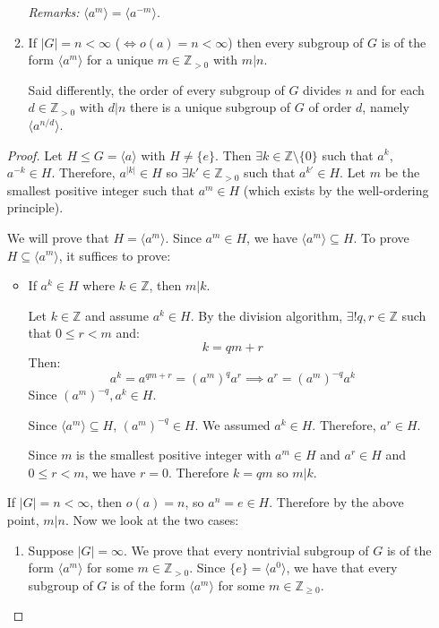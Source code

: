 \begin{itemize}
\begin{theorem}
\begin{enumerate}
            \textit{Remarks:} $\langle a^m \rangle = \langle a^{-m}\rangle $.
            \item If $|G|=n < \infty$ ($\iff o(a) = n < \infty$) then every subgroup of $G$ is of the form $\langle a^m\rangle$ for a unique $m \in \mathbb{Z}_{>0}$ with $m|n$.
            
            Said differently, the order of every subgroup of $G$ divides $n$ and for each $d\in \mathbb{Z}_{>0}$ with $d|n$ there is a unique subgroup of $G$ of order $d$, namely $\langle a^{n/d} \rangle$.
        \end{enumerate}
    \end{theorem}
    \begin{proof}
        Let $H \le G = \langle a\rangle$ with $H \neq \{e\}$. Then $\exists k \in \mathbb{Z} \setminus \{0\}$ such that $a^k$, $a^{-k} \in H$. Therefore, $a^{|k|} \in H$ so $\exists k' \in \mathbb{Z}_{>0}$ such that $a^{k'} \in H$. Let $m$ be the smallest positive integer such that $a^m \in H$ (which exists by the well-ordering principle).
        \vspace{2mm}

        We will prove that $H= \langle a^m \rangle$. Since $a^m \in H$, we have $\langle a^m\rangle \subseteq H$. To prove $H \subseteq \langle a^m \rangle$, it suffices to prove:
        \begin{itemize}
            \item If $a^k \in H$ where $k\in \mathbb{Z}$, then $m|k$.
            
            Let $k\in \mathbb{Z}$ and assume $a^k \in H$. By the division algorithm, $\exists! q,r \in \mathbb{Z}$ such that $0\le r < m$ and:
            \begin{equation}
                k=qm + r
            \end{equation}
            Then:
            \begin{equation}
                a^k=a^{qm+r}=(a^m)^qa^r \implies a^r = (a^m)^{-q}a^k
            \end{equation}
            Since $(a^m)^{-q},a^k \in H$.

            Since $\langle a^m\rangle \subseteq H$, $(a^m)^{-q} \in H$. We assumed $a^k \in H$. Therefore, $a^r \in H$.

            Since $m$ is the smallest positive integer with $a^m \in H$ and $a^r \in H$ and $0 \le r < m$, we have $r=0$. Therefore $k=qm$ so $m|k$.
        \end{itemize}
        If $|G| = n < \infty$, then $o(a) = n$, so $a^n=e\in H$. Therefore by the above point, $m|n$. Now we look at the two cases:
        \begin{enumerate}
            \item Suppose $|G| = \infty$. We prove that every nontrivial subgroup of $G$ is of the form $\langle a^m \rangle$ for some $m \in \mathbb{Z}_{>0}$. Since $\{e\}= \langle a^0\rangle$, we have that every subgroup of $G$ is of the form $\langle a^m \rangle$ for some $m \in \mathbb{Z}_{\ge 0}$.
            

\end{enumerate}
\end{proof}
\end{itemize}
